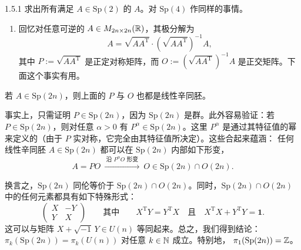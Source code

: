 \begin{wexer}{1.5.1}
求出所有满足 $A\in\mathrm{Sp}(2)$ 的 $A$。对 $\mathrm{Sp}(4)$ 作同样的事情。
\end{wexer}

\begin{enumerate}[label=(\roman*),start=3]
  \item 回忆对任意可逆的 $A\in M_{2n\times2n}(\mathbb{R})$，其极分解为
\[
  A=\sqrt{AA^{\mathrm T}}\cdot\left(\sqrt{AA^{\mathrm T}}\right)^{-1}A,
\]
其中 $P:=\sqrt{AA^{\mathrm T}}$ 是正定对称矩阵，而 $O:=\left(\sqrt{AA^{\mathrm T}}\right)^{-1}A$
是正交矩阵。下面这个事实有用。
\end{enumerate}

\quad 若 $A\in\mathrm{Sp}(2n)$，则上面的 $P$ 与 $O$ 也都是线性辛同胚。

事实上，只需证明 $P\in\mathrm{Sp}(2n)$，因为 $\mathrm{Sp}(2n)$ 是群。此外容易验证：若
$P\in\mathrm{Sp}(2n)$，则对任意 $\alpha>0$ 有 $P^\alpha\in\mathrm{Sp}(2n)$。这里 $P^\alpha$
是通过其特征值的幂来定义的（由于 $P$ 实对称，它完全由其特征值所决定）。这些合起来蕴涵：
任何线性辛同胚 $A\in\mathrm{Sp}(2n)$ 都可以在 $\mathrm{Sp}(2n)$ 内部如下形变，
\[
  A=PO\ \xrightarrow{\ \text{沿 }P^\alpha O\text{ 形变}\ }\ O\in\mathrm{Sp}(2n)\cap O(2n).
\]

换言之，$\mathrm{Sp}(2n)$ 同伦等价于 $\mathrm{Sp}(2n)\cap O(2n)$。同时，$\mathrm{Sp}(2n)\cap O(2n)$
中的任何元素都具有如下特殊形式：
\[
  \begin{pmatrix}X&-Y\\ Y&X\end{pmatrix}
  \qquad\text{其中}\qquad
  X^{\mathrm T}Y=Y^{\mathrm T}X
  \quad\text{且}\quad
  X^{\mathrm T}X+Y^{\mathrm T}Y=\mathbf{1}.
\]
这可以与矩阵 $X+\sqrt{-1}\,Y\in U(n)$ 等同起来。总之，我们得到结论：
$\pi_k(\mathrm{Sp}(2n))=\pi_k(U(n))$ 对任意 $k\in\mathbb{N}$ 成立。特别地，
$\pi_1(\mathrm{Sp}(2n))=\mathbb{Z}$。

